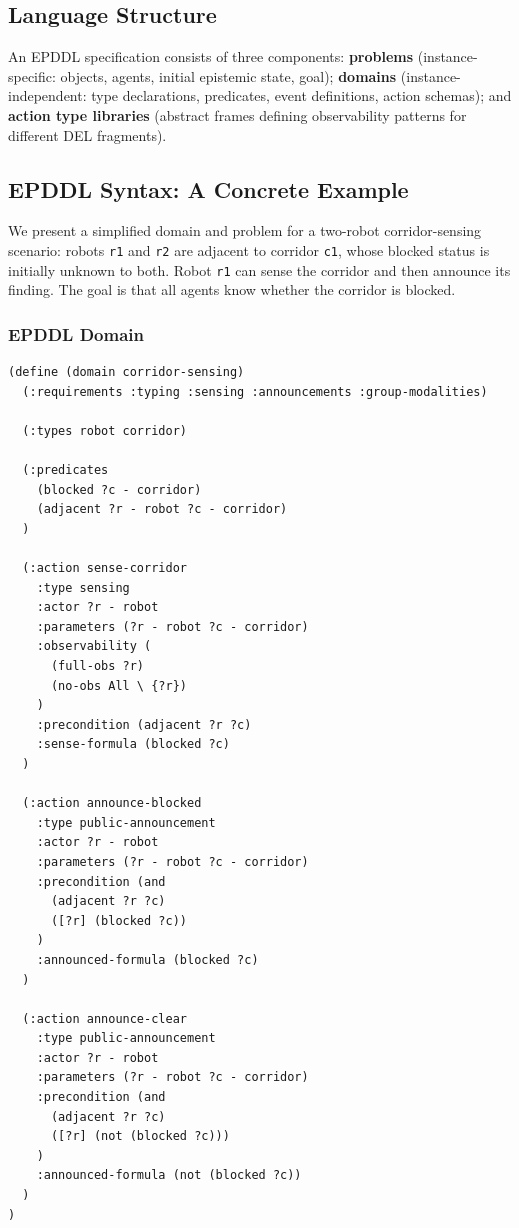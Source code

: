 \documentclass[12pt,a4paper]{article}
\theoremstyle{definition}
\theoremstyle{plain}
\begin{document}
\subsection{Language Structure}

An EPDDL specification consists of three components: \textbf{problems} (instance-specific:
objects, agents, initial epistemic state, goal); \textbf{domains} (instance-independent: type
declarations, predicates, event definitions, action schemas); and \textbf{action type libraries}
(abstract frames defining observability patterns for different DEL fragments).

\subsection{EPDDL Syntax: A Concrete Example}

We present a simplified domain and problem for a two-robot corridor-sensing scenario: robots
\texttt{r1} and \texttt{r2} are adjacent to corridor \texttt{c1}, whose blocked status is
initially unknown to both. Robot \texttt{r1} can sense the corridor and then announce its finding.
The goal is that all agents know whether the corridor is blocked.

\subsubsection{EPDDL Domain}

\begin{lstlisting}[language={}, caption={EPDDL domain for a two-robot sensing and announcement
scenario (\texttt{corridor\_sensing.epddl}).}, label=lst:epddldomain]
(define (domain corridor-sensing)
  (:requirements :typing :sensing :announcements :group-modalities)

  (:types robot corridor)

  (:predicates
    (blocked ?c - corridor)
    (adjacent ?r - robot ?c - corridor)
  )

  (:action sense-corridor
    :type sensing
    :actor ?r - robot
    :parameters (?r - robot ?c - corridor)
    :observability (
      (full-obs ?r)
      (no-obs All \ {?r})
    )
    :precondition (adjacent ?r ?c)
    :sense-formula (blocked ?c)
  )

  (:action announce-blocked
    :type public-announcement
    :actor ?r - robot
    :parameters (?r - robot ?c - corridor)
    :precondition (and
      (adjacent ?r ?c)
      ([?r] (blocked ?c))
    )
    :announced-formula (blocked ?c)
  )

  (:action announce-clear
    :type public-announcement
    :actor ?r - robot
    :parameters (?r - robot ?c - corridor)
    :precondition (and
      (adjacent ?r ?c)
      ([?r] (not (blocked ?c)))
    )
    :announced-formula (not (blocked ?c))
  )
)
\end{lstlisting}
\end{document}
